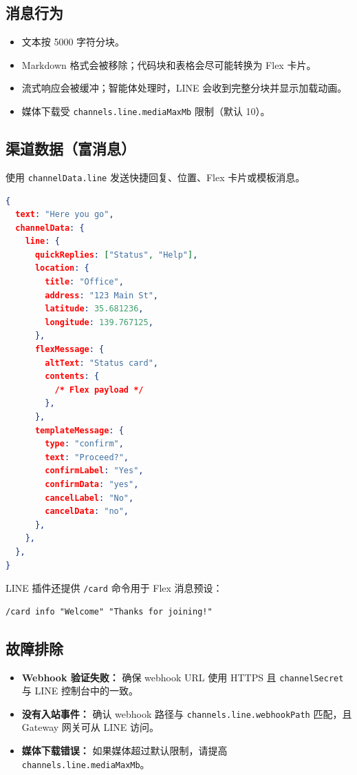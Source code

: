 \subsection{消息行为}


\begin{itemize}
  \item 文本按 5000 字符分块。
  \item Markdown 格式会被移除；代码块和表格会尽可能转换为 Flex 卡片。
  \item 流式响应会被缓冲；智能体处理时，LINE 会收到完整分块并显示加载动画。
  \item 媒体下载受 \texttt{channels.line.mediaMaxMb} 限制（默认 10）。
\end{itemize}


\subsection{渠道数据（富消息）}


使用 \texttt{channelData.line} 发送快捷回复、位置、Flex 卡片或模板消息。

\begin{lstlisting}[language=json]
{
  text: "Here you go",
  channelData: {
    line: {
      quickReplies: ["Status", "Help"],
      location: {
        title: "Office",
        address: "123 Main St",
        latitude: 35.681236,
        longitude: 139.767125,
      },
      flexMessage: {
        altText: "Status card",
        contents: {
          /* Flex payload */
        },
      },
      templateMessage: {
        type: "confirm",
        text: "Proceed?",
        confirmLabel: "Yes",
        confirmData: "yes",
        cancelLabel: "No",
        cancelData: "no",
      },
    },
  },
}
\end{lstlisting}


LINE 插件还提供 \texttt{/card} 命令用于 Flex 消息预设：

\begin{lstlisting}
/card info "Welcome" "Thanks for joining!"
\end{lstlisting}


\subsection{故障排除}


\begin{itemize}
  \item \textbf{Webhook 验证失败：} 确保 webhook URL 使用 HTTPS 且 \texttt{channelSecret} 与 LINE 控制台中的一致。
  \item \textbf{没有入站事件：} 确认 webhook 路径与 \texttt{channels.line.webhookPath} 匹配，且 Gateway 网关可从 LINE 访问。
  \item \textbf{媒体下载错误：} 如果媒体超过默认限制，请提高 \texttt{channels.line.mediaMaxMb}。
\end{itemize}



